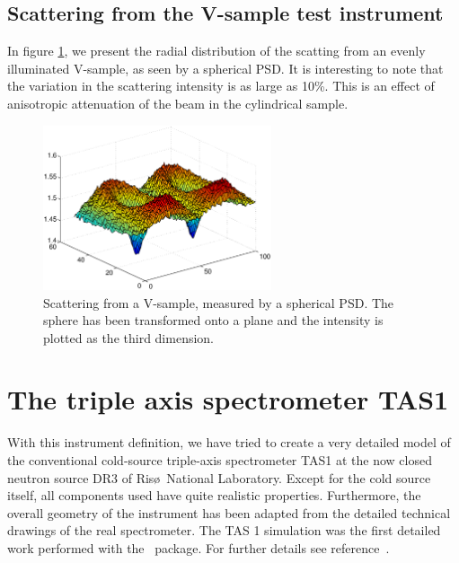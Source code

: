 \subsection{Scattering from the V-sample test instrument}
\label{s:vanadium-result}

In figure \ref{f:V-results}, we present the radial distribution
of the scatting from an evenly illuminated V-sample,
as seen by a spherical PSD.
It is interesting to note that the variation in the
scattering intensity is as large as 10\%. This is an effect
of anisotropic attenuation of the beam in the cylindrical sample.

\begin{figure}
  \begin{center}
    \includegraphics[width=0.6\textwidth]{figures/vanadium-surf-2.eps}
  \end{center}
\caption{Scattering from a V-sample, measured by a spherical
  PSD. The sphere has been transformed onto a plane and the intensity is
  plotted as the third dimension. }
\label{f:V-results}
\end{figure}



\section{The triple axis spectrometer TAS1}
\label{s:TAS1}
With this instrument definition, we have tried to create
a very detailed model of the conventional cold-source
triple-axis spectrometer TAS1 at the now closed neutron source DR3 of
Ris\o\ National Laboratory.
Except for the cold source itself, all components
used have quite realistic properties. Furthermore, the overall
geometry of the instrument has been adapted from
the detailed technical drawings of the real spectrometer.
The TAS 1 simulation was the first detailed work
performed with the \MCS\ package.
For further details see reference~\cite{tas1_report}.

